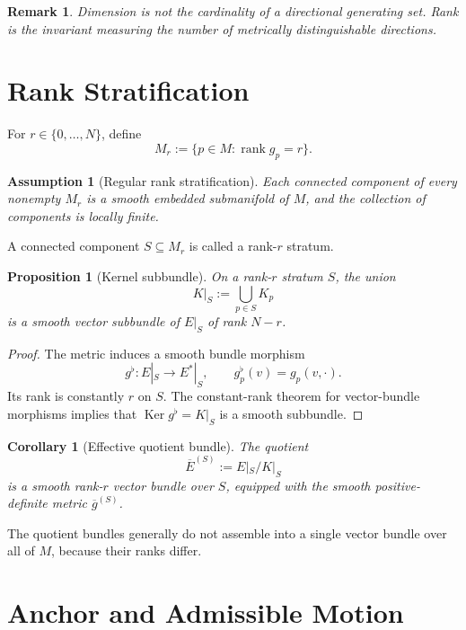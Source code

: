 \documentclass[11pt]{article}
\newtheorem{assumption}{Assumption}[section]
\newtheorem{proposition}{Proposition}[section]
\newtheorem{corollary}{Corollary}[section]
\newtheorem{remark}{Remark}[section]
\newcommand{\Ker}{\operatorname{Ker}}
\newcommand{\rank}{\operatorname{rank}}
\begin{document}
\begin{remark}
Dimension is not the cardinality of a directional generating set. Rank is the
invariant measuring the number of metrically distinguishable directions.
\end{remark}

\section{Rank Stratification}
\label{sec:strata}

For $r\in\{0,\ldots,N\}$, define
\[
M_r:=\{p\in M:\rank g_p=r\}.
\]

\begin{assumption}[Regular rank stratification]
Each connected component of every nonempty $M_r$ is a smooth embedded
submanifold of $M$, and the collection of components is locally finite.
\end{assumption}

A connected component $S\subseteq M_r$ is called a rank-$r$ stratum.

\begin{proposition}[Kernel subbundle]
On a rank-$r$ stratum $S$, the union
\[
K|_S:=\bigcup_{p\in S}K_p
\]
is a smooth vector subbundle of $E|_S$ of rank $N-r$.
\end{proposition}

\begin{proof}
The metric induces a smooth bundle morphism
\[
g^\flat:E|_S\to E^*|_S,
\qquad g^\flat_p(v)=g_p(v,\cdot).
\]
Its rank is constantly $r$ on $S$. The constant-rank theorem for vector-bundle
morphisms implies that $\Ker g^\flat=K|_S$ is a smooth subbundle.
\end{proof}

\begin{corollary}[Effective quotient bundle]
The quotient
\[
\overline E^{(S)}:=E|_S/K|_S
\]
is a smooth rank-$r$ vector bundle over $S$, equipped with the smooth
positive-definite metric $\overline g^{(S)}$.
\end{corollary}

The quotient bundles generally do not assemble into a single vector bundle
over all of $M$, because their ranks differ.

\section{Anchor and Admissible Motion}
\label{sec:anchor}
\end{document}
